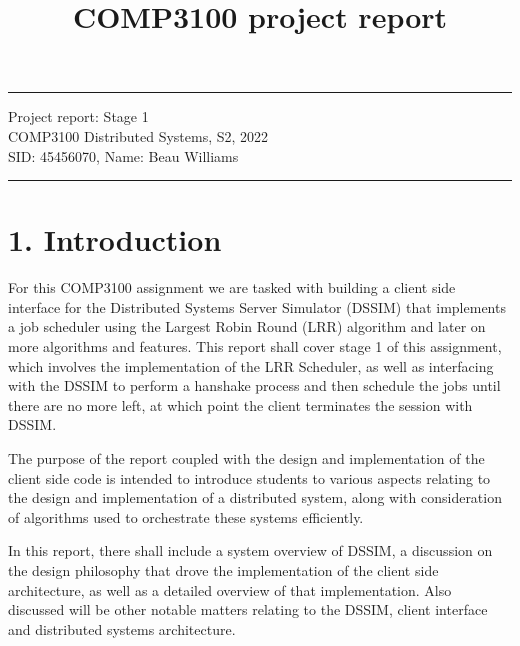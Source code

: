 \documentclass[a4paper]{article} %
\begin{document}

\title{COMP3100 project report} %
\fancyhead[C]{}
\hrule \medskip %
\begin{minipage}{1\textwidth} %
\centering 
\large %
Project report: Stage 1\\ %
COMP3100 Distributed Systems, S2, 2022\\
\normalsize %
SID: 45456070, Name: Beau Williams
\end{minipage}
\medskip\hrule %
\bigskip


\section*{1. Introduction}
For this COMP3100 assignment we are tasked with building a client side interface for the Distributed Systems Server Simulator (DSSIM)\cite{dssim} that implements a job scheduler using the Largest Robin Round (LRR) algorithm and later on more algorithms and features. This report shall cover stage 1 of this assignment, which involves the implementation of the LRR Scheduler, as well as interfacing with the DSSIM to perform a hanshake process and then schedule the jobs until there are no more left, at which point the client terminates the session with DSSIM.
\newline

The purpose of the report coupled with the design and implementation of the client side code is intended to introduce students to various aspects relating to the design and implementation of a distributed system, along with consideration of algorithms used to orchestrate these systems efficiently.
\newline

In this report, there shall include a system overview of DSSIM, a discussion on the design philosophy that drove the implementation of the client side architecture, as well as a detailed overview of that implementation. Also discussed will be other notable matters relating to the DSSIM, client interface and distributed systems architecture.
\end{document}

